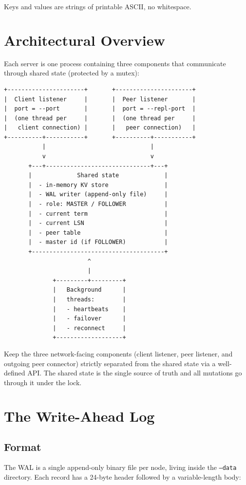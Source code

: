 \documentclass[11pt,a4paper]{article}
\begin{document}
Keys and values are strings of printable ASCII, no whitespace.

\section{Architectural Overview}

Each server is one process containing three components that communicate through shared state (protected by a mutex):

\begin{codebox}
\begin{lstlisting}
+----------------------+       +----------------------+
|  Client listener     |       |  Peer listener       |
|  port = --port       |       |  port = --repl-port  |
|  (one thread per     |       |  (one thread per     |
|   client connection) |       |   peer connection)   |
+----------+-----------+       +----------+-----------+
           |                              |
           v                              v
       +---+------------------------------+---+
       |             Shared state             |
       |  - in-memory KV store                |
       |  - WAL writer (append-only file)     |
       |  - role: MASTER / FOLLOWER           |
       |  - current term                      |
       |  - current LSN                       |
       |  - peer table                        |
       |  - master id (if FOLLOWER)           |
       +--------------------------------------+
                        ^
                        |
              +---------+---------+
              |   Background      |
              |   threads:        |
              |   - heartbeats    |
              |   - failover      |
              |   - reconnect     |
              +-------------------+
\end{lstlisting}
\end{codebox}

Keep the three network-facing components (client listener, peer listener, and outgoing peer connector) strictly separated from the shared state via a well-defined API. The shared state is the single source of truth and all mutations go through it under the lock.

\section{The Write-Ahead Log}

\subsection{Format}
The WAL is a single append-only binary file per node, living inside the \texttt{--data} directory. Each record has a 24-byte header followed by a variable-length body:
\end{document}

